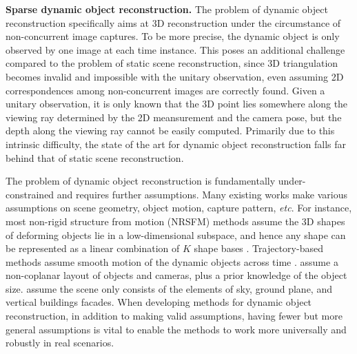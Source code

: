 \textbf{Sparse dynamic object reconstruction.}
The problem of dynamic object reconstruction specifically aims at 3D reconstruction under the circumstance of non-concurrent image captures. To be more precise, the dynamic object is only observed by one image at each time instance. This poses an additional challenge compared to the problem of static  scene reconstruction, since 3D triangulation becomes invalid and impossible with the unitary observation, even assuming 2D correspondences among non-concurrent images are correctly found. Given a unitary observation, it is only known that the 3D point lies somewhere along the viewing ray determined by the 2D meansurement and the camera pose, but the depth along the viewing ray cannot be easily computed. Primarily due to this intrinsic difficulty, the state of the art for dynamic object reconstruction falls far behind that of static scene reconstruction.

The problem of dynamic object reconstruction is fundamentally under-constrained and requires further assumptions. Many existing works make various assumptions on scene geometry, object motion, capture pattern, \emph{etc}. For instance, most non-rigid structure from motion (NRSFM) methods assume the 3D shapes of deforming objects lie in a low-dimensional subspace, and hence any shape can be represented as a linear combination of $K$ shape bases \cite{Bregler_CVPR2000,torresani2008nonrigid,dai2014simple}. Trajectory-based methods assume smooth motion of the dynamic objects across time \cite{Akhter_NIPS08}.
\citet{bao2011toward} assume a non-coplanar layout of objects and cameras, plus a prior knowledge of the object size. \citet{Hoiem_CGRAPH2005} assume the scene only consists of the elements of sky, ground plane, and vertical buildings facades. When developing methods for dynamic object reconstruction, in addition to making valid assumptions, having fewer but more general assumptions is vital to enable the methods to work more universally and robustly in real scenarios. 

